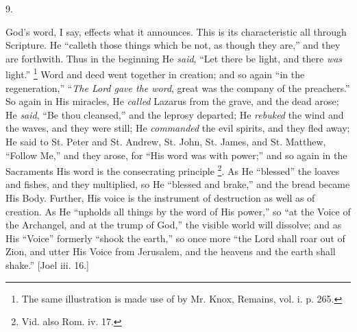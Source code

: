 9.

God's word, I say, effects what it announces. This is its
characteristic all through Scripture. He ``calleth those things
which be not, as though they are,'' and they are forthwith. Thus
in the beginning He \emph{said}, ``Let there be light, and there \emph{was}
light.'' \footnote{The same
illustration is made use of by Mr. Knox, Remains, vol. i. p. 265.} Word and
deed went together in creation; and so again ``in the
regeneration,'' ``\emph{The Lord gave the word}, great was the
company of the preachers.'' So again in His miracles, He \emph{called}
Lazarus from the grave, and the dead arose; He \emph{said}, ``Be
thou cleansed,'' and the leprosy departed; He \emph{rebuked} the
wind and the waves, and they were still; He \emph{commanded} the evil
spirits, and they fled away; He said to St. Peter and St. Andrew, St.
John, St. James, and St. Matthew, ``Follow Me,'' and they
arose, for ``His word was with power;'' and so again in the
Sacraments His word is the consecrating principle \footnote{Vid. also Rom.
iv. 17.}. As He ``blessed'' the loaves and fishes, and they
multiplied, so He ``blessed and brake,'' and the bread became
His Body. Further, His voice is the instrument of destruction as well
as of creation. As He ``upholds all things by the word of His
power,'' so ``at the Voice of the Archangel, and at the trump
of God,'' the visible world will dissolve; and as His
``Voice'' formerly ``shook the earth,'' so once more
``the Lord shall roar out of Zion, and utter His Voice from
Jerusalem, and the heavens and the earth shall shake.'' [Joel iii.
16.]


